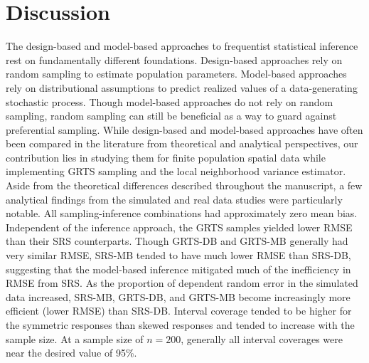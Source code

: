 \documentclass[]{elsarticle} %
\begin{document}
\hypertarget{sec:discussion}{%
\section{Discussion}\label{sec:discussion}}

The design-based and model-based approaches to frequentist statistical
inference rest on fundamentally different foundations. Design-based
approaches rely on random sampling to estimate population parameters.
Model-based approaches rely on distributional assumptions to predict
realized values of a data-generating stochastic process. Though
model-based approaches do not rely on random sampling, random sampling
can still be beneficial as a way to guard against preferential sampling.
While design-based and model-based approaches have often been compared
in the literature from theoretical and analytical perspectives, our
contribution lies in studying them for finite population spatial data
while implementing GRTS sampling and the local neighborhood variance
estimator. Aside from the theoretical differences described throughout
the manuscript, a few analytical findings from the simulated and real
data studies were particularly notable. All sampling-inference
combinations had approximately zero mean bias. Independent of the
inference approach, the GRTS samples yielded lower RMSE than their SRS
counterparts. Though GRTS-DB and GRTS-MB generally had very similar
RMSE, SRS-MB tended to have much lower RMSE than SRS-DB, suggesting that
the model-based inference mitigated much of the inefficiency in RMSE
from SRS. As the proportion of dependent random error in the simulated
data increased, SRS-MB, GRTS-DB, and GRTS-MB become increasingly more
efficient (lower RMSE) than SRS-DB. Interval coverage tended to be
higher for the symmetric responses than skewed responses and tended to
increase with the sample size. At a sample size of \(n = 200\),
generally all interval coverages were near the desired value of 95\%.
\end{document}
